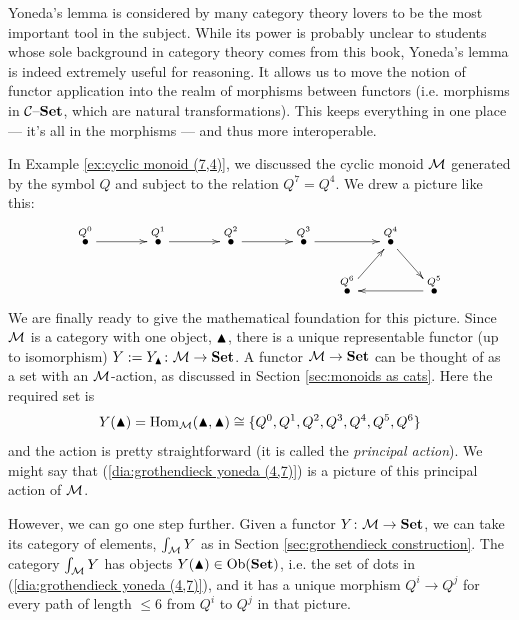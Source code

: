 \documentclass[CT4S-EN-RU]{subfiles}
\begin{document}
\begin{blockENG}
Yoneda's lemma is considered by many category theory lovers to be the most important tool in the subject. While its power is probably unclear to students whose sole background in category theory comes from this book, Yoneda's lemma is indeed extremely useful for reasoning. It allows us to move the notion of functor application into the realm of morphisms between functors (i.e. morphisms in $\mathcal{C}{\text \textendash}{\mathbf{Set}}$, which are natural transformations). This keeps everything in one place — it's all in the morphisms — and thus more interoperable.
\end{blockENG}

\begin{blockRUS}
\end{blockRUS}

\begin{exampleENG}\label{ex:yoneda for cyclic monoid}
In Example \ref{ex:cyclic monoid (7,4)}, we discussed the cyclic monoid $\mathcal{M}$ generated by the symbol $Q$ and subject to the relation $Q^7=Q^4$. We drew a picture like this: 
\begin{align}\label{dia:grothendieck yoneda (4,7)}
\xymatrix@=15pt{
\LMO{Q^0}\ar[rr]&&\LMO{Q^1}\ar[rr]&&\LMO{Q^2}\ar[rr]&&\LMO{Q^3}\ar[rr]&&\LMO{Q^4}\ar[dr]\\
&&&&&&&\LMO{Q^6}\ar[ur]&&\LMO{Q^5}\ar[ll]
}
\end{align}
We are finally ready to give the mathematical foundation for this picture. Since $\mathcal{M}$ is a category with one object, $\blacktriangle$, there is a unique representable functor (up to isomorphism) $Y:=Y_\blacktriangle\colon\mathcal{M}\rightarrow{\mathbf{Set}}$. A functor $\mathcal{M}\rightarrow{\mathbf{Set}}$ can be thought of as a set with an $\mathcal{M}$-action, as discussed in Section \ref{sec:monoids as cats}. Here the required set is 
$$Y(\blacktriangle)=\textnormal{Hom}_\mathcal{M}(\blacktriangle,\blacktriangle)\cong\{Q^0,Q^1,Q^2,Q^3,Q^4,Q^5,Q^6\}$$ 
and the action is pretty straightforward (it is called the {\em principal action}). We might say that (\ref{dia:grothendieck yoneda (4,7)}) is a picture of this principal action of $\mathcal{M}$. 

However, we can go one step further. Given a functor $Y\colon\mathcal{M}\rightarrow{\mathbf{Set}}$, we can take its category of elements, $\int_\mathcal{M} Y$ as in Section \ref{sec:grothendieck construction}. The category $\int_\mathcal{M} Y$ has objects $Y(\blacktriangle)\in\textnormal{Ob}({\mathbf{Set}})$, i.e. the set of dots in (\ref{dia:grothendieck yoneda (4,7)}), and it has a unique morphism $Q^i\to Q^j$ for every path of length $\leq 6$ from $Q^i$ to $Q^j$ in that picture.
\end{exampleENG}
\end{document}
